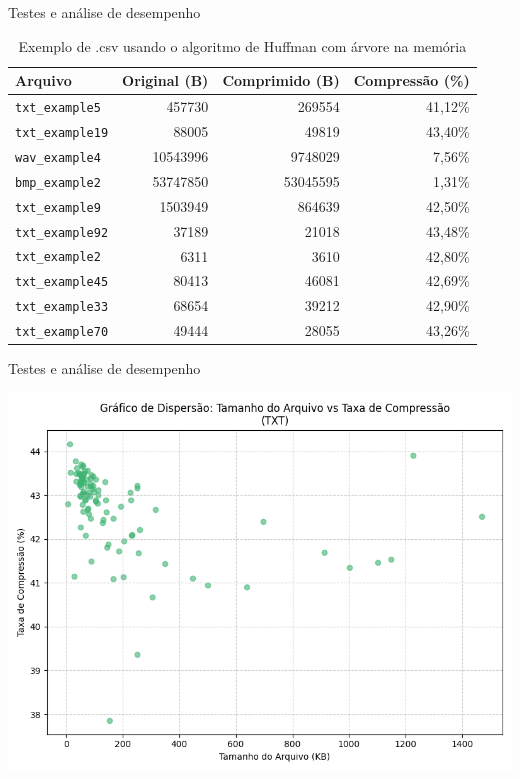 \documentclass{beamer}
\begin{document}
\begin{frame}{Testes e análise de desempenho}
\begin{table}[h]
\centering
\begin{tabular}{|l|r|r|r|}
\hline
\textbf{Arquivo} & \textbf{Original (B)} & \textbf{Comprimido (B)} & \textbf{Compressão (\%)} \\
\hline
\texttt{txt\_example5} & 457730 & 269554 & 41,12\% \\
\texttt{txt\_example19} & 88005 & 49819 & 43,40\% \\
\texttt{wav\_example4} & 10543996 & 9748029 & 7,56\% \\
\texttt{bmp\_example2} & 53747850 & 53045595 & 1,31\% \\
\texttt{txt\_example9} & 1503949 & 864639 & 42,50\% \\
\texttt{txt\_example92} & 37189 & 21018 & 43,48\% \\
\texttt{txt\_example2} & 6311 & 3610 & 42,80\% \\
\texttt{txt\_example45} & 80413 & 46081 & 42,69\% \\
\texttt{txt\_example33} & 68654 & 39212 & 42,90\% \\
\texttt{txt\_example70} & 49444 & 28055 & 43,26\% \\
\hline
\end{tabular}
\caption{Exemplo de .csv usando o algoritmo de Huffman com árvore na memória}
\end{table}
\end{frame}

\begin{frame}{Testes e análise de desempenho}
    \begin{center}
        \includegraphics[width=0.8\linewidth]{imagens/file_sizes_huffman0_txt_scatter_plot}
    \end{center}
\end{frame}
\end{document}
